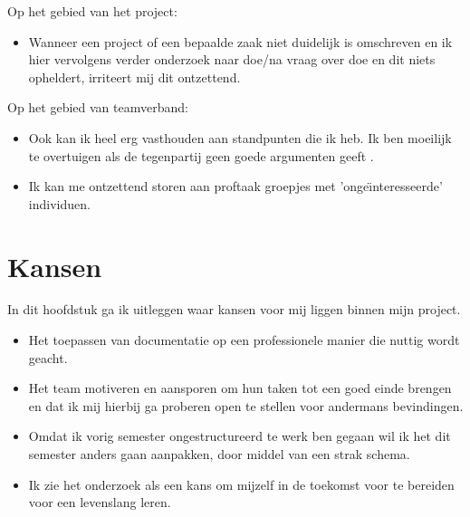 \documentclass[11pt, twoside]{report}
\begin{document}
    Op het gebied van het project:
    \begin{itemize}
        \item[] Wanneer een project of een bepaalde zaak niet duidelijk is omschreven en ik hier vervolgens verder onderzoek naar doe/na vraag over doe en dit niets opheldert, irriteert mij dit ontzettend.
    \end{itemize}

    Op het gebied van teamverband:
    \begin{itemize}
        \item[] Ook kan ik heel erg vasthouden aan standpunten die ik heb. Ik ben moeilijk te overtuigen als de tegenpartij geen goede argumenten geeft .
        \item[] Ik kan me ontzettend storen aan proftaak groepjes met 'onge\"{\i}nteresseerde' individuen.
    \end{itemize}


    \section{Kansen}\label{sec:kansen}
    In dit hoofdstuk ga ik uitleggen waar kansen voor mij liggen binnen mijn project.

    \begin{itemize}
        \item[] Het toepassen van documentatie op een professionele manier die nuttig wordt geacht.
        \item[] Het team motiveren en aansporen om hun taken tot een goed einde brengen en dat ik mij hierbij ga proberen open te stellen voor andermans bevindingen.
        \item[] Omdat ik vorig semester ongestructureerd te werk ben gegaan wil ik het dit semester anders gaan aanpakken, door middel van een strak schema.
        \item[] Ik zie het onderzoek als een kans om mijzelf in de toekomst voor te bereiden voor een levenslang leren.
    \end{itemize}
\end{document}
